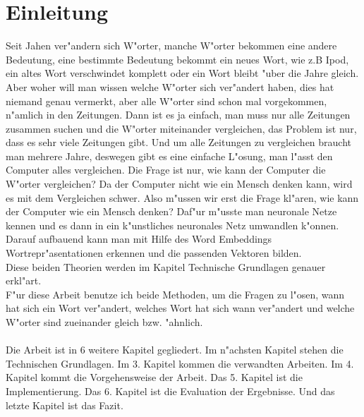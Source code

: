 \chapter{Einleitung}

Seit Jahen ver"andern sich W"orter, manche W"orter bekommen eine andere Bedeutung, eine bestimmte Bedeutung bekommt ein neues Wort, wie z.B Ipod, ein altes Wort verschwindet komplett oder ein Wort bleibt "uber die Jahre gleich. Aber woher will man wissen welche W"orter sich ver"andert haben, dies hat niemand genau vermerkt, aber alle W"orter sind schon mal vorgekommen, n"amlich in den Zeitungen. Dann ist es ja einfach,  man muss nur alle Zeitungen zusammen suchen und die W"orter miteinander vergleichen, das Problem ist nur, dass es sehr viele Zeitungen gibt. Und um alle Zeitungen zu vergleichen braucht man mehrere Jahre, deswegen gibt es eine einfache L"osung, man l"asst den Computer alles vergleichen. Die Frage ist nur, wie kann der Computer die W"orter vergleichen? Da der Computer nicht wie ein Mensch denken kann, wird es mit dem Vergleichen schwer. Also m"ussen wir erst die Frage kl"aren, wie kann der Computer wie ein Mensch denken?
Daf"ur m"usste man neuronale Netze kennen und es dann in ein k"unstliches neuronales Netz umwandlen k"onnen.  Darauf aufbauend kann man mit Hilfe des Word Embeddings Wortrepr"asentationen erkennen und die passenden Vektoren bilden.\\
Diese beiden Theorien werden im Kapitel Technische Grundlagen genauer erkl"art.\\
F"ur diese Arbeit benutze ich beide Methoden, um die Fragen zu l"osen, wann hat sich ein Wort ver"andert, welches Wort hat sich wann ver"andert und welche W"orter sind zueinander gleich bzw. "ahnlich.\\\\

Die Arbeit ist in 6 weitere Kapitel gegliedert.
Im n"achsten Kapitel stehen die Technischen Grundlagen. Im 3. Kapitel kommen die verwandten Arbeiten. Im 4. Kapitel kommt die Vorgehensweise der Arbeit. Das 5. Kapitel ist die Implementierung. Das 6. Kapitel ist die Evaluation der Ergebnisse. Und das letzte Kapitel ist das Fazit.





